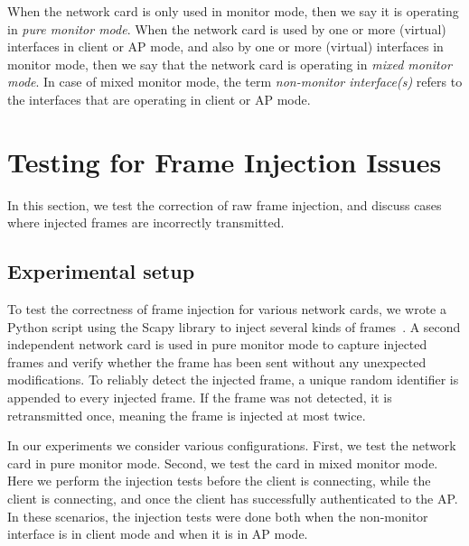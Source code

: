 \documentclass[sigconf]{acmart}
\newcommand{\red}[1]{\textcolor{red}{#1}}
\begin{document}
When the network card is only used in monitor mode, then we say it is operating in \emph{pure monitor mode}.
When the network card is used by one or more (virtual) interfaces in client or AP mode, and also by one or more (virtual) interfaces in monitor mode, then we say that the network card is operating in \emph{mixed monitor mode}.
In case of mixed monitor mode, the term \emph{non-monitor interface(s)} refers to the interfaces that are operating in client or AP mode.

%

\section{Testing for Frame Injection Issues}
\label{sec:injectionproblems}

In this section, we test the correction of raw frame injection,
and discuss cases where injected frames are incorrectly transmitted.

\subsection{Experimental setup}

To test the correctness of frame injection for various network cards, we wrote a Python script using the Scapy library to inject several kinds of frames~\cite{repository}.
A second independent network card is used in pure monitor mode to capture injected frames and verify whether the frame has been sent without any unexpected modifications.
To reliably detect the injected frame, a unique random identifier is appended to every injected frame.
If the frame was not detected, it is retransmitted once, meaning the frame is injected at most twice.

In our experiments we consider various configurations.
First, we test the network card in pure monitor mode.
Second, we test the card in mixed monitor mode.
Here we perform the injection tests before the client is connecting, while the client is connecting, and once the client has successfully authenticated to the AP.
In these scenarios, the injection tests were done both when the non-monitor interface is in client mode and when it is in AP mode.
\end{document}
